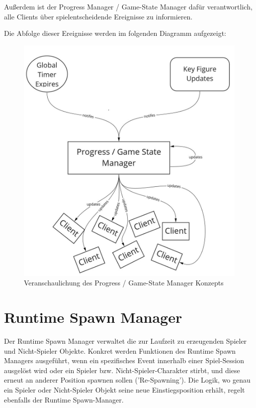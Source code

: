 Außerdem ist der Progress Manager / Game-State Manager dafür verantwortlich, alle Clients über spielentscheidende Ereignisse zu informieren. 

Die Abfolge dieser Ereignisse werden im folgenden Diagramm aufgezeigt:

\begin{figure}[H]
	\centering
	\includegraphics[width=150mm]{images/Progress_State_Manager.jpg}
	\caption[Progress / Game-State Manager]{Veranschaulichung des Progress / Game-State Manager Konzepts}
	\label{pic:Progress_State_Manager}
\end{figure}

\section{Runtime Spawn Manager}
\label{spawn_manager}

Der Runtime Spawn Manager verwaltet die zur Laufzeit zu erzeugenden Spieler und Nicht-Spieler Objekte. Konkret werden Funktionen des Runtime Spawn Managers ausgeführt, wenn ein spezifisches Event innerhalb einer Spiel-Session ausgelöst wird oder ein Spieler bzw. Nicht-Spieler-Charakter stirbt, und diese erneut an anderer Position spawnen sollen ('Re-Spawning'). Die Logik, wo genau ein Spieler oder Nicht-Spieler Objekt seine neue Einstiegsposition erhält, regelt ebenfalls der Runtime Spawn-Manager.

